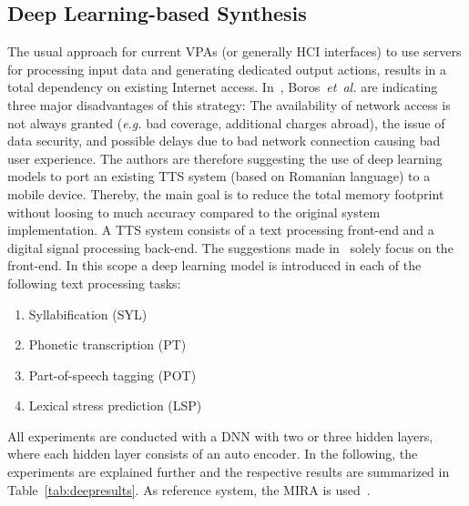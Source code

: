 \subsection{Deep Learning-based Synthesis}
\label{subsec:deepembedded}

The usual approach for current \acfp{VPA} (or generally \ac{HCI} interfaces) to use servers for processing input data and generating dedicated output actions, results in a total dependency on existing Internet access. In~\cite{boros:robust}, Boros~\textit{et~al.} are indicating three major disadvantages of this strategy: The availability of network access is not always granted (\textit{e.g.} bad coverage, additional charges abroad), the issue of data security, and possible delays due to bad network connection causing bad user experience. The authors are therefore suggesting the use of deep learning models to port an existing \ac{TTS} system (based on Romanian language) to a mobile device. Thereby, the main goal is to reduce the total memory footprint without loosing to much accuracy compared to the original system implementation. A \ac{TTS} system consists of a text processing front-end and a digital signal processing back-end. The suggestions made in~\cite{boros:robust} solely focus on the front-end. In this scope a deep learning model is introduced in each of the following text processing tasks:

\begin{enumerate}[label=\arabic*.]		%
	\parskip0.25em
	\bfseries
	\item Syllabification (SYL)
	\item Phonetic transcription (PT)
	\item Part-of-speech tagging (POT)
	\item Lexical stress prediction (LSP)
\end{enumerate}

All experiments are conducted with a \ac{DNN} with two or three hidden layers, where each hidden layer consists of an auto encoder. In the following, the experiments are explained further and the respective results are summarized in Table~\ref{tab:deepresults}. As reference system, the \ac{MIRA} is used~\cite{boros:mira}.

